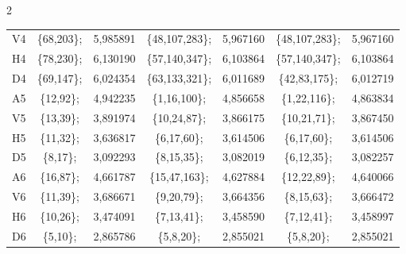 \begin{multicols}{2}
\begin{table}[b]
\begin{center}
\begin{tabular}{|c|cc|cc|cc|}

V4 & \{68,203\}; &  5,985891 & \{48,107,283\}; &  5,967160 & \{48,107,283\}; &  5,967160\\


H4 & \{78,230\}; &  6,130190 & \{57,140,347\}; &  6,103864 & \{57,140,347\}; &  6,103864\\


D4 & \{69,147\}; &  6,024354 & \{63,133,321\}; &  6,011689 & \{42,83,175\}; &  6,012719\\


A5 & \{12,92\}; &  4,942235 & \{1,16,100\}; &  4,856658 & \{1,22,116\}; &  4,863834\\


V5 & \{13,39\}; &  3,891974 & \{10,24,87\}; &  3,866175 & \{10,21,71\}; &  3,867450\\


H5 & \{11,32\}; &  3,636817 & \{6,17,60\}; &  3,614506 & \{6,17,60\}; &  3,614506\\


D5 & \{8,17\}; &  3,092293 & \{8,15,35\}; &  3,082019 & \{6,12,35\}; &  3,082257\\


A6 & \{16,87\}; &  4,661787 &\{15,47,163\}; &  4,627884 & \{12,22,89\}; &  4,640066\\


V6 & \{11,39\}; &  3,686671 &\{9,20,79\}; &  3,664356 & \{8,15,63\}; &  3,666472\\


H6 & \{10,26\}; &  3,474091 &\{7,13,41\}; &  3,458590 & \{7,12,41\}; &  3,458997\\


D6 & \{5,10\}; &  2,865786 & \{5,8,20\}; &  2,855021 & \{5,8,20\}; &  2,855021\\

\hline

\end{tabular}

\end{center}


\end{table}
\end{multicols}
